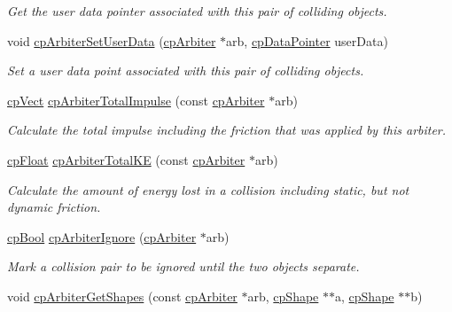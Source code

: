 \begin{DoxyCompactItemize}
\begin{DoxyCompactList}\small\item\em Get the user data pointer associated with this pair of colliding objects. \end{DoxyCompactList}\item 
void \hyperlink{group__cp_arbiter_gafb98ad7393d2f0df7212bc8653a2a4ae}{cp\+Arbiter\+Set\+User\+Data} (\hyperlink{structcp_arbiter}{cp\+Arbiter} $\ast$arb, \hyperlink{group__basic_types_ga2ac2c3c31e21893941f9e4f8ee279447}{cp\+Data\+Pointer} user\+Data)
\begin{DoxyCompactList}\small\item\em Set a user data point associated with this pair of colliding objects. \end{DoxyCompactList}\item 
\hyperlink{structcp_vect}{cp\+Vect} \hyperlink{group__cp_arbiter_ga521500a047cd9c10f7c6bfb64b3e4e50}{cp\+Arbiter\+Total\+Impulse} (const \hyperlink{structcp_arbiter}{cp\+Arbiter} $\ast$arb)
\begin{DoxyCompactList}\small\item\em Calculate the total impulse including the friction that was applied by this arbiter. \end{DoxyCompactList}\item 
\hyperlink{group__basic_types_gac1ed65573e035bf892505768c852d8d3}{cp\+Float} \hyperlink{group__cp_arbiter_ga292d7e349093c0eba4f14c7ce46956fa}{cp\+Arbiter\+Total\+K\+E} (const \hyperlink{structcp_arbiter}{cp\+Arbiter} $\ast$arb)
\begin{DoxyCompactList}\small\item\em Calculate the amount of energy lost in a collision including static, but not dynamic friction. \end{DoxyCompactList}\item 
\hyperlink{group__basic_types_gabc5e752c48f3449ca26ef413ecbd647e}{cp\+Bool} \hyperlink{group__cp_arbiter_ga23c479da664722be4a87420822ff6591}{cp\+Arbiter\+Ignore} (\hyperlink{structcp_arbiter}{cp\+Arbiter} $\ast$arb)
\begin{DoxyCompactList}\small\item\em Mark a collision pair to be ignored until the two objects separate. \end{DoxyCompactList}\item 
void \hyperlink{group__cp_arbiter_ga2efa3b9fe882a1a0218cff4ae1449ccd}{cp\+Arbiter\+Get\+Shapes} (const \hyperlink{structcp_arbiter}{cp\+Arbiter} $\ast$arb, \hyperlink{structcp_shape}{cp\+Shape} $\ast$$\ast$a, \hyperlink{structcp_shape}{cp\+Shape} $\ast$$\ast$b)

\end{DoxyCompactItemize}
